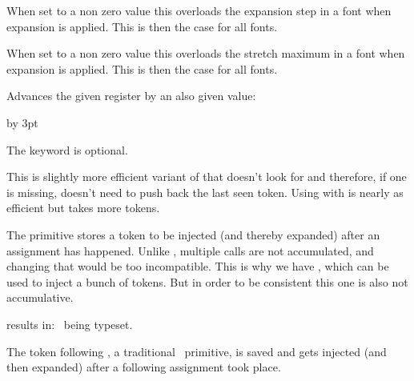 \startnewprimitive[title={\prm {adjustspacingstep}}]

When set to a non zero value this overloads the expansion step in a font when
expansion is applied. This is then the case for all fonts.

\stopnewprimitive

\startnewprimitive[title={\prm {adjustspacingstretch}}]

When set to a non zero value this overloads the stretch maximum in a font when
expansion is applied. This is then the case for all fonts.

\stopnewprimitive

\startoldprimitive[title={\prm {advance}}]

Advances the given register by an also given value:

\starttyping
\advance\scratchdimen      10pt
\advance\scratchdimen      by 3pt
\advance\scratchcounterone \zerocount
\advance\scratchcounterone \scratchcountertwo
\stoptyping

The  keyword is optional.

\stopoldprimitive

\startnewprimitive[title={\prm {advanceby}}]

This is slightly more efficient variant of  that doesn't look for
 and therefore, if one is missing, doesn't need to push back the last
seen token. Using  with  is nearly as efficient but takes
more tokens.

\stopnewprimitive

\startnewprimitive[title={\prm {afterassigned}}]

The  primitive stores a token to be injected (and thereby
expanded) after an assignment has happened. Unlike , multiple
calls are not accumulated, and changing that would be too incompatible. This is
why we have , which can be used to inject a bunch of
tokens. But in order to be consistent this one is also not accumulative.

\startbuffer
{}%
%
\stopbuffer

\typebuffer

results in: \inlinebuffer\ being typeset.

\stopnewprimitive

\startoldprimitive[title={\prm {afterassignment}}]

The token following , a traditional \TEX\ primitive, is
saved and gets injected (and then expanded) after a following assignment took
place.

